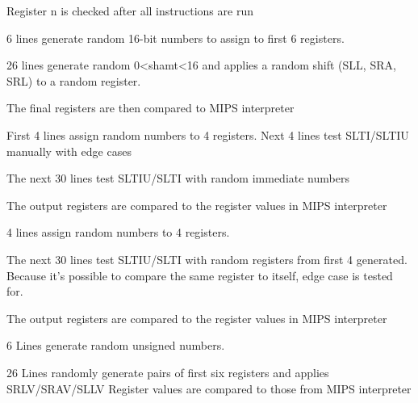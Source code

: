 \documentclass[10pt]{article}
\begin{document}
 Register n is checked after all instructions are run

 6 lines generate random 16-bit numbers to assign to first 6 registers.
 
 26 lines generate random 0<shamt<16 and applies a random shift (SLL, SRA, SRL) to a random register. 
 
 The final registers are then compared to MIPS interpreter

 First 4 lines assign random numbers to 4 registers. Next 4 lines test SLTI/SLTIU manually with edge cases
 
 The next 30 lines test SLTIU/SLTI with random immediate numbers
 
 The output registers are compared to the register values in MIPS interpreter

 4 lines assign random numbers to 4 registers.
 
 The next 30 lines test SLTIU/SLTI with random registers from first 4 generated. Because it's possible to compare the same register to itself, edge case is tested for. 
 
 The output registers are compared to the register values in MIPS interpreter

 6 Lines generate random unsigned numbers.

 26 Lines randomly generate pairs of first six registers and applies SRLV/SRAV/SLLV
 Register values are compared to those from MIPS interpreter
\end{document}
